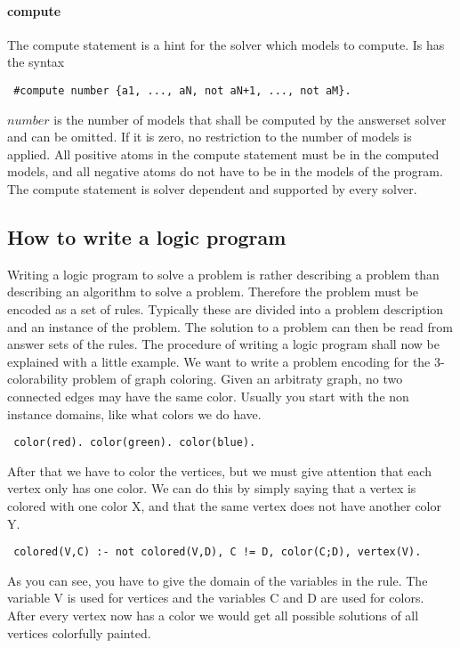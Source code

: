 \documentclass[a4paper,10pt]{article}
\begin{document}
\paragraph{compute}
The compute statement is a hint for the solver which models to compute.
Is has the syntax
\begin{verbatim}
 #compute number {a1, ..., aN, not aN+1, ..., not aM}.
\end{verbatim}
$number$ is the number of models that shall be computed by the answerset solver and can be omitted. If it is zero, no restriction to the number of models is applied.
All positive atoms in the compute statement must be in the computed models, and all negative atoms do not have to be in the models of the program.
The compute statement is solver dependent and supported by every solver.

\subsection{How to write a logic program}
Writing a logic program to solve a problem is rather describing a problem than describing an algorithm to solve a problem.
Therefore the problem must be encoded as a set of rules.
Typically these are divided into a problem description and an instance of the problem.
The solution to a problem can then be read from answer sets of the rules.
The procedure of writing a logic program shall now be explained with a little example.
We want to write a problem encoding for the 3-colorability problem of graph coloring.
Given an arbitraty graph, no two connected edges may have the same color.
\newline
Usually you start with the non instance domains, like what colors we do have.
\begin{verbatim}
 color(red). color(green). color(blue).
\end{verbatim}
After that we have to color the vertices, but we must give attention that each vertex only has one color.
We can do this by simply saying that a vertex is colored with one color X, and that the same vertex does not have another color Y.
\begin{verbatim}
 colored(V,C) :- not colored(V,D), C != D, color(C;D), vertex(V).
\end{verbatim}
As you can see, you have to give the domain of the variables in the rule.
The variable V is used for vertices and the variables C and D are used for colors.
After every vertex now has a color we would get all possible solutions of all vertices colorfully painted.
\end{document}
